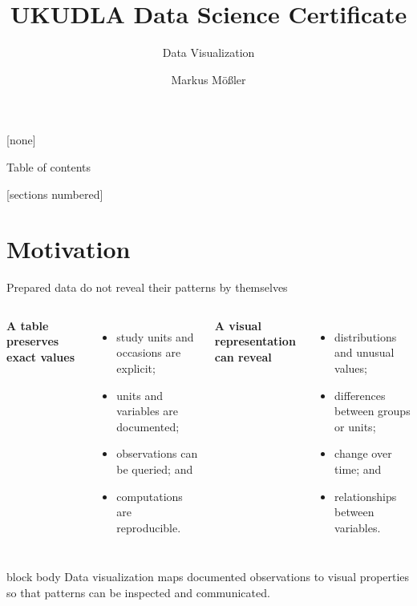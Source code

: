 \documentclass[10pt,aspectratio=169]{beamer}
\title{UKUDLA Data Science Certificate}
\subtitle{Data Visualization}
\author{Markus Mößler}
\institute{University of Hohenheim}
\begin{document}
\maketitle

{
[none]

\begin{frame}[noframenumbering]{Table of contents}

  \small
  [sections numbered]
  \tableofcontents[hideallsubsections]

\end{frame}
}



\section{Motivation}


\begin{frame}{Prepared data do not reveal their patterns by themselves}

\small

\begin{columns}[T]


\textbf{A table preserves exact values}

\begin{itemize}
  \item study units and occasions are explicit;
  \item units and variables are documented;
  \item observations can be queried; and
  \item computations are reproducible.
\end{itemize}


\textbf{A visual representation can reveal}

\begin{itemize}
  \item distributions and unusual values;
  \item differences between groups or units;
  \item change over time; and
  \item relationships between variables.
\end{itemize}

\end{columns}

\vspace{0.35cm}

\begin{beamercolorbox}[rounded=true,sep=8pt]{block body}
Data visualization maps documented observations to visual properties so that patterns can be inspected and communicated.
\end{beamercolorbox}

\end{frame}
\end{document}
